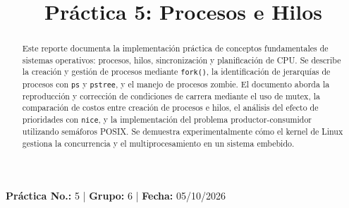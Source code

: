 \documentclass[conference]{IEEEtran}
\begin{document}
\title{Práctica 5: Procesos e Hilos}

\author{
	\and
	\and
	\and
	\and
	\and
}

\maketitle

\begin{center}
	\vspace{-0.3cm}
	{\small
		\textbf{Práctica No.:} 5 \quad | \quad
		\textbf{Grupo:} 6 \quad | \quad
		\textbf{Fecha:} 05/10/2026
	}
	\vspace{0.2cm}
\end{center}

\begin{abstract}
	Este reporte documenta la implementación práctica de conceptos fundamentales de sistemas operativos: procesos, hilos, sincronización y planificación de CPU. Se describe la creación y gestión de procesos mediante \texttt{fork()}, la identificación de jerarquías de procesos con \texttt{ps} y \texttt{pstree}, y el manejo de procesos zombie. El documento aborda la reproducción y corrección de condiciones de carrera mediante el uso de mutex, la comparación de costos entre creación de procesos e hilos, el análisis del efecto de prioridades con \texttt{nice}, y la implementación del problema productor-consumidor utilizando semáforos POSIX. Se demuestra experimentalmente cómo el kernel de Linux gestiona la concurrencia y el multiprocesamiento en un sistema embebido.
\end{abstract}
\end{document}
